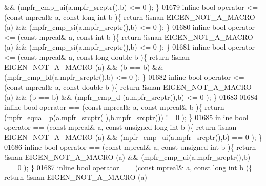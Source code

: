 \begin{DoxyCode}
       && (mpfr\_cmp\_ui(a.mpfr\_srcptr(),b) <= 0 );                \}
01679 \textcolor{keyword}{inline} \textcolor{keywordtype}{bool} operator <= (\textcolor{keyword}{const} mpreal& a, \textcolor{keyword}{const} \textcolor{keywordtype}{long} \textcolor{keywordtype}{int} b          )\{  \textcolor{keywordflow}{return} !isnan EIGEN\_NOT\_A\_MACRO (a)
       && (mpfr\_cmp\_si(a.mpfr\_srcptr(),b) <= 0 );                \}
01680 \textcolor{keyword}{inline} \textcolor{keywordtype}{bool} operator <= (\textcolor{keyword}{const} mpreal& a, \textcolor{keyword}{const} \textcolor{keywordtype}{int} b               )\{  \textcolor{keywordflow}{return} !isnan EIGEN\_NOT\_A\_MACRO (a)
       && (mpfr\_cmp\_si(a.mpfr\_srcptr(),b) <= 0 );                \}
01681 \textcolor{keyword}{inline} \textcolor{keywordtype}{bool} operator <= (\textcolor{keyword}{const} mpreal& a, \textcolor{keyword}{const} \textcolor{keywordtype}{long} \textcolor{keywordtype}{double} b       )\{  \textcolor{keywordflow}{return} !isnan EIGEN\_NOT\_A\_MACRO (a)
       && (b == b) && (mpfr\_cmp\_ld(a.mpfr\_srcptr(),b) <= 0 );   \}
01682 \textcolor{keyword}{inline} \textcolor{keywordtype}{bool} operator <= (\textcolor{keyword}{const} mpreal& a, \textcolor{keyword}{const} \textcolor{keywordtype}{double} b            )\{  \textcolor{keywordflow}{return} !isnan EIGEN\_NOT\_A\_MACRO (a)
       && (b == b) && (mpfr\_cmp\_d (a.mpfr\_srcptr(),b) <= 0 );   \}
01683 
01684 \textcolor{keyword}{inline} \textcolor{keywordtype}{bool} operator == (\textcolor{keyword}{const} mpreal& a, \textcolor{keyword}{const} mpreal& b           )\{  \textcolor{keywordflow}{return} (mpfr\_equal\_p(a.mpfr\_srcptr(
      ),b.mpfr\_srcptr()) != 0 );              \}
01685 \textcolor{keyword}{inline} \textcolor{keywordtype}{bool} operator == (\textcolor{keyword}{const} mpreal& a, \textcolor{keyword}{const} \textcolor{keywordtype}{unsigned} \textcolor{keywordtype}{long} \textcolor{keywordtype}{int} b )\{  \textcolor{keywordflow}{return} !isnan EIGEN\_NOT\_A\_MACRO (a)
       && (mpfr\_cmp\_ui(a.mpfr\_srcptr(),b) == 0 );                \}
01686 \textcolor{keyword}{inline} \textcolor{keywordtype}{bool} operator == (\textcolor{keyword}{const} mpreal& a, \textcolor{keyword}{const} \textcolor{keywordtype}{unsigned} \textcolor{keywordtype}{int} b      )\{  \textcolor{keywordflow}{return} !isnan EIGEN\_NOT\_A\_MACRO (a)
       && (mpfr\_cmp\_ui(a.mpfr\_srcptr(),b) == 0 );                \}
01687 \textcolor{keyword}{inline} \textcolor{keywordtype}{bool} operator == (\textcolor{keyword}{const} mpreal& a, \textcolor{keyword}{const} \textcolor{keywordtype}{long} \textcolor{keywordtype}{int} b          )\{  \textcolor{keywordflow}{return} !isnan EIGEN\_NOT\_A\_MACRO (a)

\end{DoxyCode}
